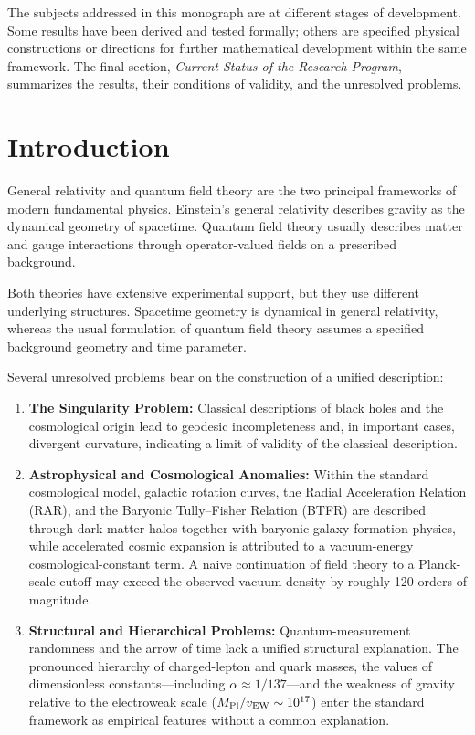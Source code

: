 \documentclass[11pt,a4paper]{article}
\begin{document}
The subjects addressed in this monograph are at different stages of development. Some results have been derived and tested formally; others are specified physical constructions or directions for further mathematical development within the same framework. The final section, \emph{Current Status of the Research Program}, summarizes the results, their conditions of validity, and the unresolved problems.

\section*{Introduction}

General relativity and quantum field theory are the two principal frameworks of modern fundamental physics. Einstein's general relativity describes gravity as the dynamical geometry of spacetime. Quantum field theory usually describes matter and gauge interactions through operator-valued fields on a prescribed background.

Both theories have extensive experimental support, but they use different underlying structures. Spacetime geometry is dynamical in general relativity, whereas the usual formulation of quantum field theory assumes a specified background geometry and time parameter.

Several unresolved problems bear on the construction of a unified description:
\begin{enumerate}[label=\arabic*.]
\item \textbf{The Singularity Problem:} Classical descriptions of black holes and the cosmological origin lead to geodesic incompleteness and, in important cases, divergent curvature, indicating a limit of validity of the classical description.
\item \textbf{Astrophysical and Cosmological Anomalies:} Within the standard cosmological model, galactic rotation curves, the Radial Acceleration Relation (RAR), and the Baryonic Tully--Fisher Relation (BTFR) are described through dark-matter halos together with baryonic galaxy-formation physics, while accelerated cosmic expansion is attributed to a vacuum-energy cosmological-constant term. A naive continuation of field theory to a Planck-scale cutoff may exceed the observed vacuum density by roughly 120 orders of magnitude.
\item \textbf{Structural and Hierarchical Problems:} Quantum-measurement randomness and the arrow of time lack a unified structural explanation. The pronounced hierarchy of charged-lepton and quark masses, the values of dimensionless constants---including $\alpha \approx 1/137$---and the weakness of gravity relative to the electroweak scale ($M_{\rm Pl}/v_{\rm EW} \sim 10^{17}$) enter the standard framework as empirical features without a common explanation.
\end{enumerate}
\end{document}
